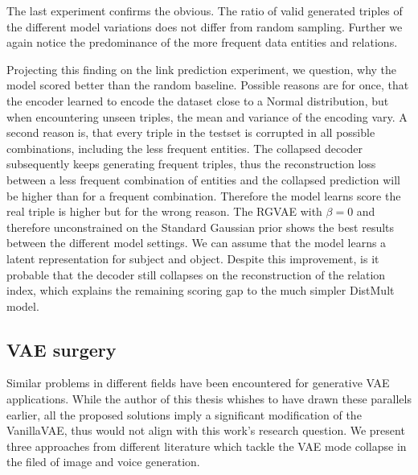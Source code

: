 The last experiment confirms the obvious. The ratio of valid generated triples of the different model variations does not differ from random sampling. Further we again notice the predominance of the more frequent data entities and relations.


Projecting this finding on the link prediction experiment, we question, why the model scored better than the random baseline. Possible reasons are for once, that the encoder learned to encode the dataset close to a Normal distribution, but when encountering unseen triples, the mean and variance of the encoding vary. A second reason is, that every triple in the testset is corrupted in all possible combinations, including the less frequent entities. The collapsed decoder subsequently keeps generating frequent triples, thus the reconstruction loss between a less frequent combination of entities and the collapsed prediction will be higher than for a frequent combination. Therefore the model learns score the real triple is higher but for the wrong reason. The RGVAE with $\beta = 0$ and therefore unconstrained on the Standard Gaussian prior shows the best results between the different model settings. We can assume that the model learns a latent representation for subject and object. Despite this improvement, is it probable that the decoder still collapses on the reconstruction of the relation index, which explains the remaining scoring gap to the much simpler DistMult model.


\subsection{VAE surgery}
\label{ssec7:solutions}

Similar problems in different fields have been encountered for generative VAE applications. While the author of this thesis whishes to have drawn these parallels earlier, all the proposed solutions imply a significant modification of the VanillaVAE, thus would not align with this work's research question. We present three approaches from different literature which tackle the VAE mode collapse in the filed of image and voice generation.

